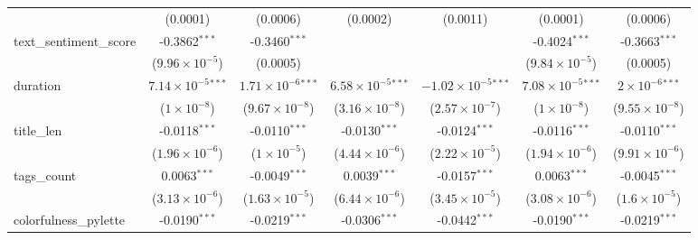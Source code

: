 \begin{table}[htbp]
\begin{tabular}{lcccccc}
                                     & (0.0001)                       & (0.0006)                       & (0.0002)                       & (0.0011)                       & (0.0001)                      & (0.0006)\\   
      text\_sentiment\_score         & -0.3862$^{***}$                & -0.3460$^{***}$                &                                &                                & -0.4024$^{***}$               & -0.3663$^{***}$\\   
                                     & ($9.96\times 10^{-5}$)         & (0.0005)                       &                                &                                & ($9.84\times 10^{-5}$)        & (0.0005)\\   
      duration                       & $7.14\times 10^{-5}$$^{***}$   & $1.71\times 10^{-6}$$^{***}$   & $6.58\times 10^{-5}$$^{***}$   & $-1.02\times 10^{-5}$$^{***}$  & $7.08\times 10^{-5}$$^{***}$  & $2\times 10^{-6}$$^{***}$\\    
                                     & ($1\times 10^{-8}$)            & ($9.67\times 10^{-8}$)         & ($3.16\times 10^{-8}$)         & ($2.57\times 10^{-7}$)         & ($1\times 10^{-8}$)           & ($9.55\times 10^{-8}$)\\    
      title\_len                     & -0.0118$^{***}$                & -0.0110$^{***}$                & -0.0130$^{***}$                & -0.0124$^{***}$                & -0.0116$^{***}$               & -0.0110$^{***}$\\   
                                     & ($1.96\times 10^{-6}$)         & ($1\times 10^{-5}$)            & ($4.44\times 10^{-6}$)         & ($2.22\times 10^{-5}$)         & ($1.94\times 10^{-6}$)        & ($9.91\times 10^{-6}$)\\    
      tags\_count                    & 0.0063$^{***}$                 & -0.0049$^{***}$                & 0.0039$^{***}$                 & -0.0157$^{***}$                & 0.0063$^{***}$                & -0.0045$^{***}$\\   
                                     & ($3.13\times 10^{-6}$)         & ($1.63\times 10^{-5}$)         & ($6.44\times 10^{-6}$)         & ($3.45\times 10^{-5}$)         & ($3.08\times 10^{-6}$)        & ($1.6\times 10^{-5}$)\\    
      colorfulness\_pylette          & -0.0190$^{***}$                & -0.0219$^{***}$                & -0.0306$^{***}$                & -0.0442$^{***}$                & -0.0190$^{***}$               & -0.0219$^{***}$\\   

\end{tabular}
\end{table}
